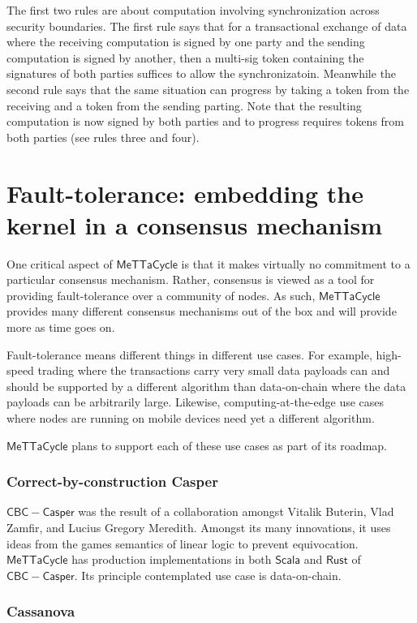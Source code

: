 \documentclass{article}
\newcommand{\MC}{\mathsf{MeTTaCycle}}
\begin{document}
The first two rules are about computation involving synchronization
across security boundaries. The first rule says that for a
transactional exchange of data where the receiving computation is
signed by one party and the sending computation is signed by another,
then a multi-sig token containing the signatures of both parties
suffices to allow the synchronizatoin. Meanwhile the second rule says
that the same situation can progress by taking a token from the
receiving and a token from the sending parting. Note that the
resulting computation is now signed by both parties and to progress
requires tokens from both parties (see rules three and four).

\section{Fault-tolerance: embedding the kernel in a consensus mechanism}

One critical aspect of $\MC$ is that it makes virtually no commitment
to a particular consensus mechanism. Rather, consensus is viewed as a
tool for providing fault-tolerance over a community of nodes. As such,
$\MC$ provides many different consensus mechanisms out of the box and
will provide more as time goes on.

Fault-tolerance means different things in different use cases. For
example, high-speed trading where the transactions carry very small
data payloads can and should be supported by a different algorithm
than data-on-chain where the data payloads can be arbitrarily
large. Likewise, computing-at-the-edge use cases where nodes are
running on mobile devices need yet a different algorithm.

$\MC$ plans to support each of these use cases as part of its roadmap.

\subsubsection{Correct-by-construction Casper}

$\mathsf{CBC-Casper}$ was the result of a collaboration amongst
Vitalik Buterin, Vlad Zamfir, and Lucius Gregory Meredith. Amongst its
many innovations, it uses ideas from the games semantics of linear
logic to prevent equivocation. $\MC$ has production implementations in
both $\mathsf{Scala}$ and $\mathsf{Rust}$ of
$\mathsf{CBC-Casper}$. Its principle contemplated use case is
data-on-chain.

\subsubsection{Cassanova}
\end{document}
